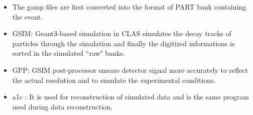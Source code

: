 \begin {itemize}
\item The gamp files are first converted into the format of PART bank containing the event.
\item GSIM:  Geant3-based simulation in CLAS simulates the decay tracks of particles through the simulation and finally the digitized informations is sorted in the simulated ``raw" banks.
\item GPP: GSIM post-processor smears detector signal more accurately to reflect the actual resolution and to simulate the experimental conditions.  
\item a1c : It is used for reconstruction of simulated data and is the same program used during data reconstruction.
\end {itemize}
